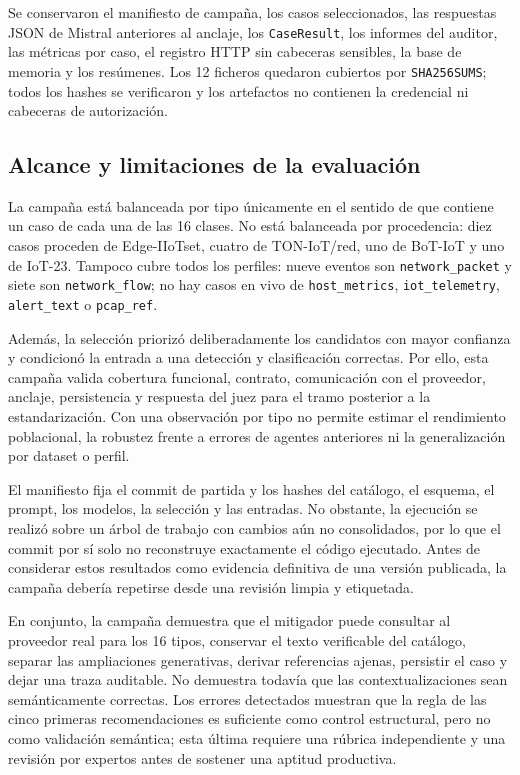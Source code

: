 Se conservaron el manifiesto de campaña, los casos seleccionados, las respuestas
JSON de Mistral anteriores al anclaje, los \texttt{CaseResult}, los informes del
auditor, las métricas por caso, el registro HTTP sin cabeceras sensibles, la base
de memoria y los resúmenes. Los 12 ficheros quedaron cubiertos por
\texttt{SHA256SUMS}; todos los hashes se verificaron y los artefactos no contienen
la credencial ni cabeceras de autorización.

\subsection{Alcance y limitaciones de la evaluación}

La campaña está balanceada por tipo únicamente en el sentido de que contiene un
caso de cada una de las 16 clases. No está balanceada por procedencia: diez casos
proceden de Edge-IIoTset, cuatro de TON-IoT/red, uno de BoT-IoT y uno de IoT-23.
Tampoco cubre todos los perfiles: nueve eventos son
\texttt{network\_packet} y siete son \texttt{network\_flow}; no hay casos en
vivo de \texttt{host\_metrics}, \texttt{iot\_telemetry},
\texttt{alert\_text} o \texttt{pcap\_ref}.

Además, la selección priorizó deliberadamente los candidatos con mayor confianza
y condicionó la entrada a una detección y clasificación correctas. Por ello,
esta campaña valida cobertura funcional, contrato, comunicación con el proveedor,
anclaje, persistencia y respuesta del juez para el tramo posterior a la
estandarización. Con una observación por tipo no permite estimar el rendimiento
poblacional, la robustez frente a errores de agentes anteriores ni la
generalización por dataset o perfil.

El manifiesto fija el commit de partida y los hashes del catálogo, el esquema,
el prompt, los modelos, la selección y las entradas. No obstante, la ejecución
se realizó sobre un árbol de trabajo con cambios aún no consolidados, por lo que
el commit por sí solo no reconstruye exactamente el código ejecutado. Antes de
considerar estos resultados como evidencia definitiva de una versión publicada,
la campaña debería repetirse desde una revisión limpia y etiquetada.

En conjunto, la campaña demuestra que el mitigador puede consultar al proveedor
real para los 16 tipos, conservar el texto verificable del catálogo, separar las
ampliaciones generativas, derivar referencias ajenas, persistir el caso y dejar
una traza auditable. No demuestra todavía que las contextualizaciones sean
semánticamente correctas. Los errores detectados muestran que la regla de las
cinco primeras recomendaciones es suficiente como control estructural, pero no
como validación semántica; esta última requiere una rúbrica independiente y una
revisión por expertos antes de sostener una aptitud productiva.
